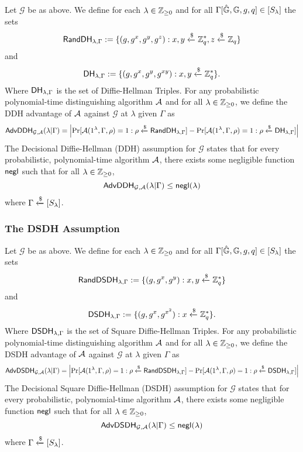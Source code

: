 Let $\mathcal{G}$ be as above. We define for each $\lambda\in\mathbb{Z}_{\geq 0}$ and for all $\Gamma[\hat{\mathbb{G}}, \mathbb{G}, g, q]\in[S_\lambda]$ the sets 
\begin{equation*}
	\mathsf{RandDH}_{\lambda,\Gamma} := \{(g, g^x, g^y, g^{z}) : x,y\xleftarrow{\$}\mathbb{Z}_q^{*}, z\xleftarrow{\$}\mathbb{Z}_q\}
\end{equation*}
and
\begin{equation*}
	\mathsf{DH}_{\lambda,\Gamma} := \{(g, g^x, g^y, g^{xy}) : x,y\xleftarrow{\$}\mathbb{Z}_q^{*}\}.
\end{equation*}
Where $\mathsf{DH}_{\lambda,\Gamma}$ is the set of Diffie-Hellman Triples. For any probabilistic polynomial-time distinguishing algorithm $\mathcal{A}$ and for all $\lambda\in\mathbb{Z}_{\geq 0}$, we define the DDH advantage of $\mathcal{A}$ against $\mathcal{G}$ at $\lambda$ given $\Gamma$ as
\begin{equation*}
	\mathsf{AdvDDH}_{\mathcal{G},\mathcal{A}}(\lambda | \Gamma) = \left|\Pr[\mathcal{A}(1^\lambda,\Gamma,\rho) = 1 : \rho\xleftarrow{\$}\mathsf{RandDH}_{\lambda,\Gamma}] - \Pr[\mathcal{A}(1^\lambda,\Gamma,\rho) = 1 : \rho\xleftarrow{\$}\mathsf{DH}_{\lambda,\Gamma}]\right|
\end{equation*}
The Decisional Diffie-Hellman (DDH) assumption for $\mathcal{G}$ states that for every probabilistic, polynomial-time algorithm $\mathcal{A}$, there exists some negligible function $\mathsf{negl}$ such that for all $\lambda\in\mathbb{Z}_{\geq 0}$, $$\mathsf{AdvDDH}_{\mathcal{G},\mathcal{A}}(\lambda | \Gamma)\leq\mathsf{negl}(\lambda)$$ where $\Gamma\xleftarrow{\$}[S_\lambda]$.

\subsubsection{The DSDH Assumption}

Let $\mathcal{G}$ be as above. We define for each $\lambda\in\mathbb{Z}_{\geq 0}$ and for all $\Gamma[\hat{\mathbb{G}}, \mathbb{G}, g, q]\in[S_\lambda]$ the sets 
\begin{equation*}
	\mathsf{RandDSDH}_{\lambda,\Gamma} := \{(g, g^x, g^{y}) : x,y\xleftarrow{\$}\mathbb{Z}_q^{*}\}
\end{equation*}
and
\begin{equation*}
	\mathsf{DSDH}_{\lambda,\Gamma} := \{(g, g^x, g^{x^2}) : x\xleftarrow{\$}\mathbb{Z}_q^{*}\}.
\end{equation*}
Where $\mathsf{DSDH}_{\lambda,\Gamma}$ is the set of Square Diffie-Hellman Triples. For any probabilistic polynomial-time distinguishing algorithm $\mathcal{A}$ and for all $\lambda\in\mathbb{Z}_{\geq 0}$, we define the DSDH advantage of $\mathcal{A}$ against $\mathcal{G}$ at $\lambda$ given $\Gamma$ as
\begin{equation*}
	\mathsf{AdvDSDH}_{\mathcal{G},\mathcal{A}}(\lambda | \Gamma) = \left|\Pr[\mathcal{A}(1^\lambda,\Gamma,\rho) = 1 : \rho\xleftarrow{\$}\mathsf{RandDSDH}_{\lambda,\Gamma}] - \Pr[\mathcal{A}(1^\lambda,\Gamma,\rho) = 1 : \rho\xleftarrow{\$}\mathsf{DSDH}_{\lambda,\Gamma}]\right|
\end{equation*}
The Decisional Square Diffie-Hellman (DSDH) assumption for $\mathcal{G}$ states that for every probabilistic, polynomial-time algorithm $\mathcal{A}$, there exists some negligible function $\mathsf{negl}$ such that for all $\lambda\in\mathbb{Z}_{\geq 0}$, $$\mathsf{AdvDSDH}_{\mathcal{G},\mathcal{A}}(\lambda | \Gamma)\leq\mathsf{negl}(\lambda)$$ where $\Gamma\xleftarrow{\$}[S_\lambda]$.



